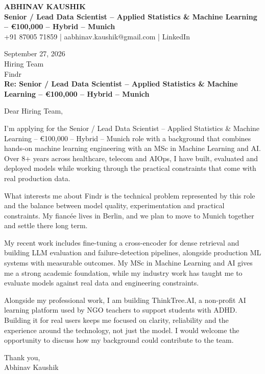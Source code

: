 \documentclass[10pt,a4paper]{article}
\begin{document}
\begin{center}
{\Large\bfseries ABHINAV KAUSHIK}\\[2pt]
{\bfseries Senior / Lead Data Scientist – Applied Statistics \& Machine Learning – €100,000 – Hybrid – Munich}\\[2pt]
+91 87005 71859 \quad | \quad aabhinav.kaushik@gmail.com \quad | \quad LinkedIn
\end{center}
\vspace{8pt}
September 27, 2026\\[6pt]
Hiring Team\\
Findr\\[4pt]
\textbf{Re: Senior / Lead Data Scientist – Applied Statistics \& Machine Learning – €100,000 – Hybrid – Munich}

Dear Hiring Team,

I’m applying for the Senior / Lead Data Scientist – Applied Statistics \& Machine Learning – €100,000 – Hybrid – Munich role with a background that combines hands-on machine learning engineering with an MSc in Machine Learning and AI. Over 8+ years across healthcare, telecom and AIOps, I have built, evaluated and deployed models while working through the practical constraints that come with real production data.

What interests me about Findr is the technical problem represented by this role and the balance between model quality, experimentation and practical constraints. My fiancée lives in Berlin, and we plan to move to Munich together and settle there long term.

My recent work includes fine-tuning a cross-encoder for dense retrieval and building LLM evaluation and failure-detection pipelines, alongside production ML systems with measurable outcomes. My MSc in Machine Learning and AI gives me a strong academic foundation, while my industry work has taught me to evaluate models against real data and engineering constraints.

Alongside my professional work, I am building ThinkTree.AI, a non-profit AI learning platform used by NGO teachers to support students with ADHD. Building it for real users keeps me focused on clarity, reliability and the experience around the technology, not just the model. I would welcome the opportunity to discuss how my background could contribute to the team.

Thank you,\\
Abhinav Kaushik
\end{document}
